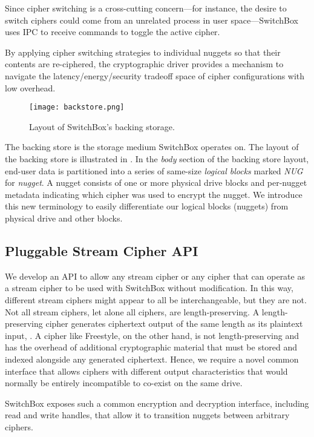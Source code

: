 Since cipher switching is a cross-cutting concern---for instance, the desire to
switch ciphers could come from an unrelated process in user space---SwitchBox
uses IPC to receive commands to toggle the active cipher.

By applying cipher switching strategies to individual nuggets so that their
contents are re-ciphered, the cryptographic driver provides a mechanism to
navigate the latency/energy/security tradeoff space of cipher configurations
with low overhead.

\begin{figure}[t]
\centering
\texttt{[image: backstore.png]}
 \caption{Layout of SwitchBox's backing storage.}\label{fig:backstore2}
\end{figure}

The backing store is the storage medium SwitchBox operates on. The layout of the
backing store is illustrated in . In the \textit{body}
section of the backing store layout, end-user data is partitioned into a series
of same-size \emph{logical blocks} marked \textit{NUG} for \emph{nugget}. A
nugget consists of one or more physical drive blocks and per-nugget metadata
indicating which cipher was used to encrypt the nugget. We introduce this new
terminology to easily differentiate our logical blocks (nuggets) from physical
drive and other blocks.

\subsection{Pluggable Stream Cipher API}

We develop an API to allow any stream cipher or any cipher that can operate as a
stream cipher to be used with SwitchBox without modification. In this way,
different stream ciphers might appear to all be interchangeable, but they are
not. Not all stream ciphers, let alone all ciphers, are length-preserving. A
length-preserving cipher generates ciphertext output of the same length as its
plaintext input, . A cipher like Freestyle, on the other hand, is
not length-preserving and has the overhead of additional cryptographic material
that must be stored and indexed alongside any generated ciphertext. Hence, we
require a novel common interface that allows ciphers with different output
characteristics that would normally be entirely incompatible to co-exist on the
same drive.

SwitchBox exposes such a common encryption and decryption interface, including
read and write handles, that allow it to transition nuggets between arbitrary
ciphers.

